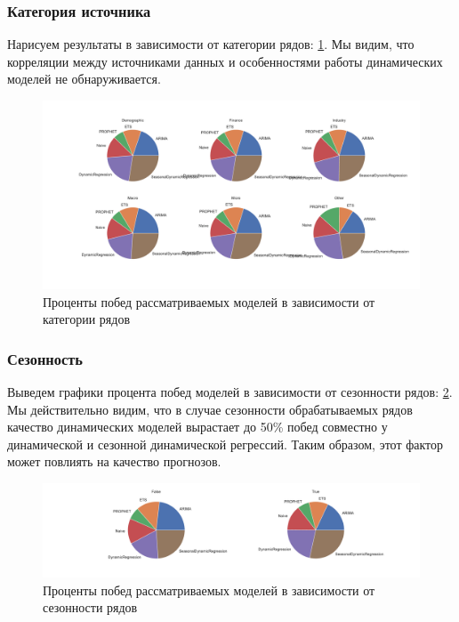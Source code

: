 \documentclass[a4paper,14pt]{extarticle}
\begin{document}
	\subsubsection{Категория источника}
	Нарисуем результаты в зависимости от категории рядов: \ref{wins:category}. Мы видим, что корреляции между источниками данных и особенностями работы динамических моделей не обнаруживается.
	\begin{figure}[!h]
		\captionsetup{justification=centering}
		\centering
		\includegraphics[width=\linewidth]{pictures/wins-category.pdf}
		\caption{Проценты побед рассматриваемых моделей в зависимости от категории рядов}
		\label{wins:category}
	\end{figure}
	\subsubsection{Сезонность}
	Выведем графики процента побед моделей в зависимости от сезонности рядов: \ref{wins:seasonality}. Мы действительно видим, что в случае сезонности обрабатываемых рядов качество динамических моделей вырастает до 50\% побед совместно у динамической и сезонной динамической регрессий. Таким образом, этот фактор может повлиять на качество прогнозов.
	\begin{figure}[!h]
		\captionsetup{justification=centering}
		\centering
		\includegraphics[width=\linewidth]{pictures/wins-seasonality.pdf}
		\caption{Проценты побед рассматриваемых моделей в зависимости от сезонности рядов}
		\label{wins:seasonality}
	\end{figure}
\end{document}
